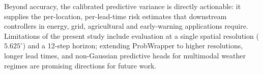 Beyond accuracy, the calibrated predictive variance is directly actionable: it supplies the per-location, per-lead-time risk estimates that downstream controllers in energy, grid, agricultural and early-warning applications require.
Limitations of the present study include evaluation at a single spatial resolution ($5.625^\circ$) and a 12-step horizon; extending ProbWrapper to higher resolutions, longer lead times, and non-Gaussian predictive heads for multimodal weather regimes are promising directions for future work.
